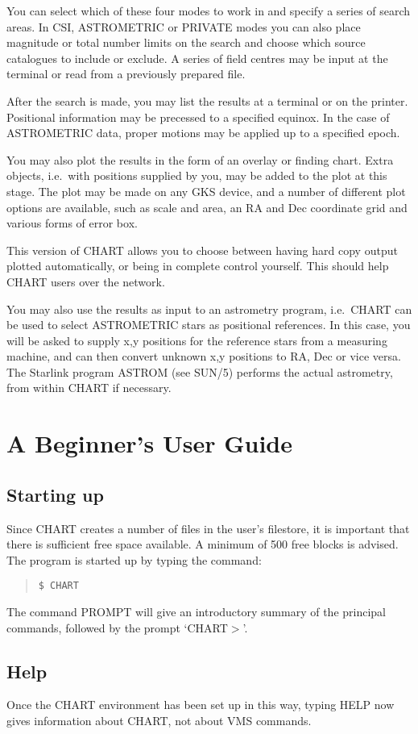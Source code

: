 \documentclass{article}
\begin{document}
You can select which of these four modes to work in and specify a series of
search areas.
In CSI, ASTROMETRIC or PRIVATE modes you can also place magnitude or total
number limits on the search and choose which source catalogues to include or
exclude.
A series of field centres may be input at the terminal or read from a previously
prepared file.

After the search is made, you may list the results at a terminal or on the
printer.
Positional information may be precessed to a specified equinox.
In the case of ASTROMETRIC data, proper motions may be applied up to a specified
epoch.

You may also plot the results in the form of an overlay or finding chart.
Extra objects, i.e.\ with positions supplied by you, may be added to the plot at
this stage.
The plot may be made on any GKS device, and a number of different plot options
are available, such as scale and area, an RA and Dec coordinate grid and various
forms of error box.

This version of CHART allows you to choose between having hard copy
output plotted automatically, or being in complete control yourself.
This should help CHART users over the network.

You may also use the results as input to an astrometry program, i.e.\ CHART
can be used to select ASTROMETRIC stars as positional references.
In this case, you will be asked to supply x,y positions for the reference
stars from a measuring machine, and can then convert unknown x,y positions to
RA, Dec or vice versa.
The Starlink program ASTROM (see SUN/5) performs the actual astrometry, from
within CHART if necessary.
\section{A Beginner's User Guide}
\subsection{Starting up}
Since CHART creates a number of files in the user's filestore, it is important
that there is sufficient free space available.
A minimum of 500 free blocks is advised.
The program is started up by typing the command:
\begin{quote}
{\tt \$ CHART}
\end{quote}
The command PROMPT will give an introductory summary of the principal commands,
followed by the prompt `CHART$>$'.
\subsection{Help}
Once the CHART environment has been set up in this way, typing HELP now gives
information about CHART, not about VMS commands.
\end{document}

